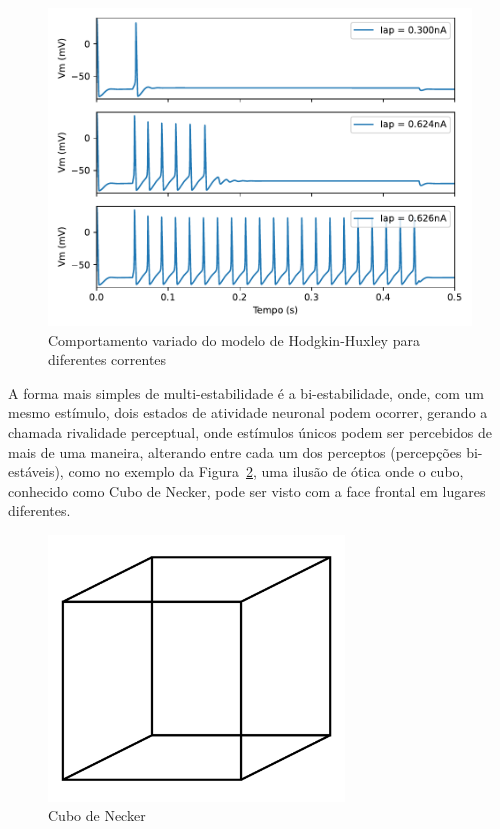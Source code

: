 \begin{figure}[tb]
	\centering
	\caption{Comportamento variado do modelo de Hodgkin-Huxley para diferentes correntes}
	\label{fig:hhdinamico}
	\includegraphics[width=0.7\linewidth]{figs/hh_dinamico}
\end{figure}
A forma mais simples de multi-estabilidade é a bi-estabilidade, onde, com um mesmo estímulo, dois estados de atividade neuronal podem ocorrer, gerando a chamada rivalidade perceptual, onde estímulos únicos podem ser percebidos de mais de uma maneira, alterando entre cada um dos perceptos (percepções bi-estáveis), como no exemplo da Figura~\ref{fig:cubonecker}, uma ilusão de ótica onde o cubo, conhecido como Cubo de Necker, pode ser visto com a face frontal em lugares diferentes.

\begin{figure}[tb]
	\centering
	\caption[Cubo de Necker]{Cubo de Necker}
	\label{fig:cubonecker}
	\includegraphics[width=0.7\textwidth]{figs/cubo_necker}
\end{figure}

